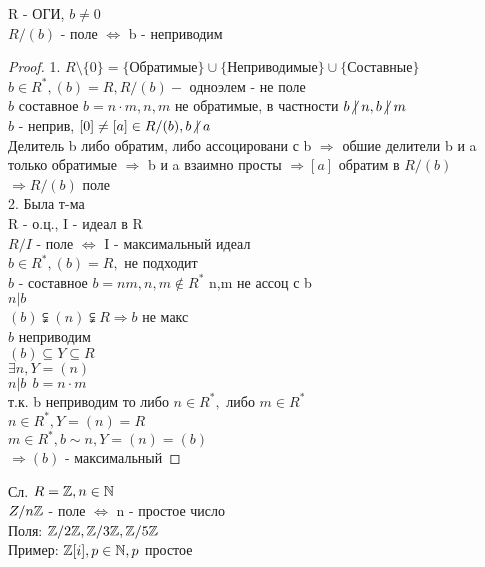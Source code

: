 \begin{theorem}
	R - ОГИ, $ b \neq 0$ \\
	$ R / (b) $ - поле $ \Leftrightarrow $ b - неприводим \\
	\begin{proof}
		1. $ R \setminus \{0\} = \{\text{Обратимые}\} \cup \{\text{Неприводимые}\} \cup \{\text{Составные}\} $ \\
		$ b \in R^*, (b) = R, R / (b) - $ одноэлем - не поле \\
		$ b $ составное $ b = n \cdot m, n, m $ не обратимые, в частности $ b \centernot| n, b \centernot| m $ \\
		$ b $  - неприв, $ [0] \neq [a] \in R / (b), b \centernot| a $ \\
		Делитель b либо обратим, либо ассоцировани с b $ \Rightarrow $ обшие делители b и a только обратимые $ \Rightarrow $ b и a взаимно просты $ \Rightarrow [a] $ обратим в $ R / (b) $ \\
		$ \Rightarrow R/(b) $ поле \\
		2. Была т-ма \\
		R - о.ц., I - идеал в R \\
		$ R / I $ - поле $ \Leftrightarrow $ I - максимальный идеал \\
		$ b \in R^*, (b) = R, $ не подходит \\
		$ b $ - составное $ b = nm, n, m \notin R^* $ n,m не ассоц с b \\
		$ n | b $ \\
		$ (b) \subsetneqq (n) \subsetneqq R \Rightarrow b $ не макс \\
		$ b $ неприводим \\
		$ (b) \subseteq Y \subseteq R $ \\
		$ \exists n, Y = (n) $ \\
		$ n | b \ \ b = n\cdot m $ \\
		т.к. b неприводим то либо $ n \in R^*, $ либо $ m \in R^* $ \\
		$ n \in R^*, Y= (n) = R $ \\
		$ m \in R^*, b \sim n , Y = (n) = (b) $ \\
		$ \Rightarrow (b) $ - максимальный  
	\end{proof}
\end{theorem}
Сл. $ R = \mathbb{Z} , n \in \mathbb{N} $ \\
$ Z / n\mathbb{Z} $ - поле $ \Leftrightarrow $ n - простое число \\
Поля: $ \mathbb{Z}/2\mathbb{Z} , \mathbb{Z}/3\mathbb{Z}, \mathbb{Z}/5\mathbb{Z} $ \\
Пример: $ \mathbb{Z}[i], p \in \mathbb{N}, p $ простое \\
